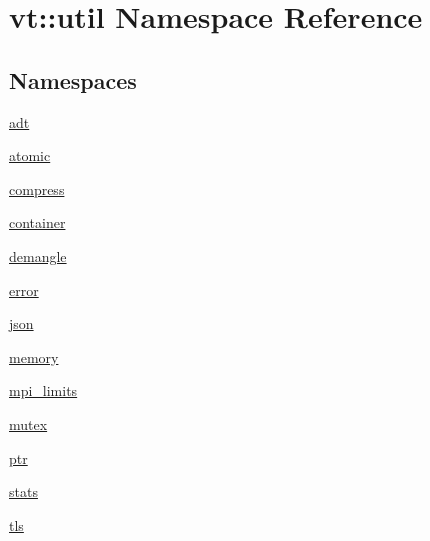 \hypertarget{namespacevt_1_1util}{}\section{vt\+:\+:util Namespace Reference}
\label{namespacevt_1_1util}
\subsection*{Namespaces}
\begin{DoxyCompactItemize}
\item 
 \hyperlink{namespacevt_1_1util_1_1adt}{adt}
\item 
 \hyperlink{namespacevt_1_1util_1_1atomic}{atomic}
\item 
 \hyperlink{namespacevt_1_1util_1_1compress}{compress}
\item 
 \hyperlink{namespacevt_1_1util_1_1container}{container}
\item 
 \hyperlink{namespacevt_1_1util_1_1demangle}{demangle}
\item 
 \hyperlink{namespacevt_1_1util_1_1error}{error}
\item 
 \hyperlink{namespacevt_1_1util_1_1json}{json}
\item 
 \hyperlink{namespacevt_1_1util_1_1memory}{memory}
\item 
 \hyperlink{namespacevt_1_1util_1_1mpi__limits}{mpi\+\_\+limits}
\item 
 \hyperlink{namespacevt_1_1util_1_1mutex}{mutex}
\item 
 \hyperlink{namespacevt_1_1util_1_1ptr}{ptr}
\item 
 \hyperlink{namespacevt_1_1util_1_1stats}{stats}
\item 
 \hyperlink{namespacevt_1_1util_1_1tls}{tls}
\end{DoxyCompactItemize}
